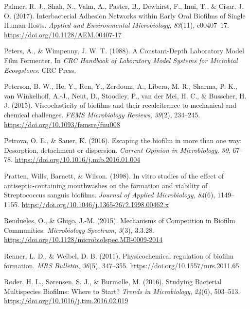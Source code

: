 \documentclass[
  b5paper,
]{book}
\newlength{\cslhangindent}
\newlength{\cslentryspacingunit} %
\newenvironment{CSLReferences}[2] %
 {%
  \setlength{\parindent}{0pt}
  \ifodd #1
  \let\oldpar\par
  \def\par{\hangindent=\cslhangindent\oldpar}
  \fi
  \setlength{\parskip}{#2\cslentryspacingunit}
 }%
 {}
\begin{document}
\begin{CSLReferences}{1}{0}
\leavevmode{}%
Palmer, R. J., Shah, N., Valm, A., Paster, B., Dewhirst, F., Inui, T.,
\& Cisar, J. O. (2017). Interbacterial {Adhesion Networks} within {Early
Oral Biofilms} of {Single Human Hosts}. \emph{Applied and Environmental
Microbiology}, \emph{83}(11), e00407--17.
\url{https://doi.org/10.1128/AEM.00407-17}

\leavevmode{}%
Peters, A., \& Wimpenny, J. W. T. (1988). A {Constant-Depth Laboratory
Model Film Fermenter}. In \emph{{CRC Handbook} of {Laboratory Model
Systems} for {Microbial Ecosystems}}. {CRC Press}.

\leavevmode{}%
Peterson, B. W., He, Y., Ren, Y., Zerdoum, A., Libera, M. R., Sharma, P.
K., van Winkelhoff, A.-J., Neut, D., Stoodley, P., van der Mei, H. C.,
\& Busscher, H. J. (2015). Viscoelasticity of biofilms and their
recalcitrance to mechanical and chemical challenges. \emph{FEMS
Microbiology Reviews}, \emph{39}(2), 234--245.
\url{https://doi.org/10.1093/femsre/fuu008}

\leavevmode{}%
Petrova, O. E., \& Sauer, K. (2016). Escaping the biofilm in more than
one way: Desorption, detachment or dispersion. \emph{Current Opinion in
Microbiology}, \emph{30}, 67--78.
\url{https://doi.org/10.1016/j.mib.2016.01.004}

\leavevmode{}%
Pratten, Wills, Barnett, \& Wilson. (1998). In vitro studies of the
effect of antiseptic-containing mouthwashes on the formation and
viability of {Streptococcus} sanguis biofilms. \emph{Journal of Applied
Microbiology}, \emph{84}(6), 1149--1155.
\url{https://doi.org/10.1046/j.1365-2672.1998.00462.x}

\leavevmode{}%
Rendueles, O., \& Ghigo, J.-M. (2015). Mechanisms of {Competition} in
{Biofilm Communities}. \emph{Microbiology Spectrum}, \emph{3}(3),
3.3.28. \url{https://doi.org/10.1128/microbiolspec.MB-0009-2014}

\leavevmode{}%
Renner, L. D., \& Weibel, D. B. (2011). Physicochemical regulation of
biofilm formation. \emph{MRS Bulletin}, \emph{36}(5), 347--355.
\url{https://doi.org/10.1557/mrs.2011.65}

\leavevmode{}%
Røder, H. L., Sørensen, S. J., \& Burmølle, M. (2016). Studying
{Bacterial Multispecies Biofilms}: {Where} to {Start}? \emph{Trends in
Microbiology}, \emph{24}(6), 503--513.
\url{https://doi.org/10.1016/j.tim.2016.02.019}


\end{CSLReferences}
\end{document}
